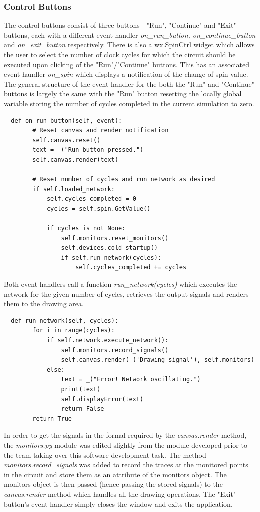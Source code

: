 \documentclass{article}					%
\begin{document}
\subsubsection{Control Buttons}
The control buttons consist of three buttons - "Run", "Continue" and "Exit" buttons, each with a different event handler \textit{on\_run\_button, on\_continue\_button} and \textit{on\_exit\_button} respectively. There is also a wx.SpinCtrl widget which allows the user to select the number of clock cycles for which the circuit should be executed upon clicking of the "Run"/"Continue" buttons. This has an associated event handler \textit{on\_spin} which displays a notification of the change of spin value. The general structure of the event handler for the both the "Run" and "Continue" buttons is largely the same with the "Run" button resetting the locally global variable storing the number of cycles completed in the current simulation to zero.
\begin{verbatim}
  def on_run_button(self, event):
        # Reset canvas and render notification
        self.canvas.reset()
        text = _("Run button pressed.")
        self.canvas.render(text)

        # Reset number of cycles and run network as desired
        if self.loaded_network:
            self.cycles_completed = 0
            cycles = self.spin.GetValue()

            if cycles is not None:
                self.monitors.reset_monitors()
                self.devices.cold_startup()
                if self.run_network(cycles):
                    self.cycles_completed += cycles
\end{verbatim}
Both event handlers call a function \textit{run\_network(cycles)} which executes the network for the given number of cycles, retrieves the output signals and renders them to the drawing area.
\begin{verbatim}
  def run_network(self, cycles):
        for i in range(cycles):
            if self.network.execute_network():
                self.monitors.record_signals()
                self.canvas.render(_('Drawing signal'), self.monitors)
            else:
                text = _("Error! Network oscillating.")
                print(text)
                self.displayError(text)
                return False
        return True
\end{verbatim}
In order to get the signals in the formal required by the \textit{canvas.render} method, the \textit{monitors.py} module was edited slightly from the module developed prior to the team taking over this software development task. The method \textit{monitors.record\_signals} was added to record the traces at the monitored points in the circuit and store them as an attribute of the monitors object. The monitors object is then passed (hence passing the stored signals) to the \textit{canvas.render} method which handles all the drawing operations. The "Exit" button's event handler simply closes the window and exits the application.
\end{document}
